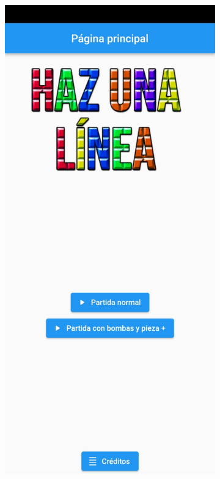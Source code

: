 \documentclass{article}
\begin{document}
\begin{figure}[H]
  \begin{subfigure}{0.5\textwidth}
          \includegraphics[width=\textwidth]{imagenes/captura7.jpeg}

\end{subfigure}
\end{figure}
\end{document}
